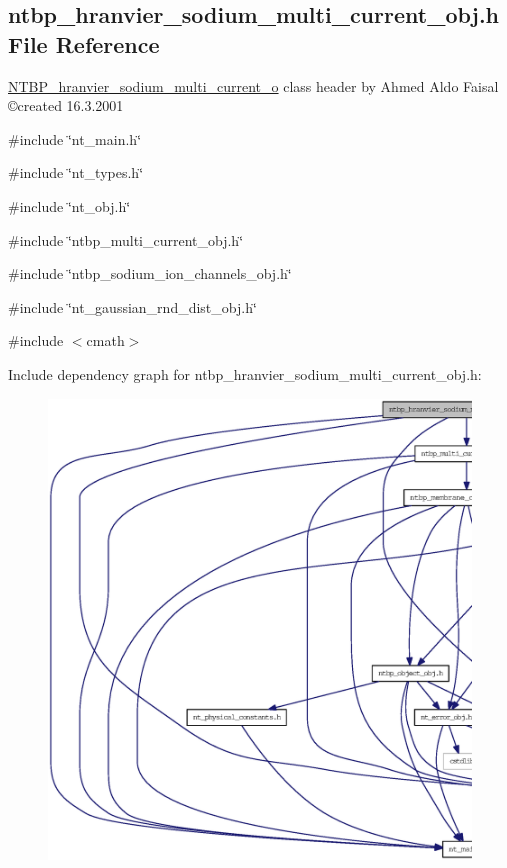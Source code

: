 \subsection{ntbp\_\-hranvier\_\-sodium\_\-multi\_\-current\_\-obj.h File Reference}
\label{ntbp__hranvier__sodium__multi__current__obj_8h}



\begin{DoxyItemize}
\item \hyperlink{class_n_t_b_p__hranvier__sodium__multi__current__o}{NTBP\_\-hranvier\_\-sodium\_\-multi\_\-current\_\-o} class header by Ahmed Aldo Faisal \copyright created 16.3.2001 
\end{DoxyItemize} 


{\ttfamily \#include \char`\"{}nt\_\-main.h\char`\"{}}\par
{\ttfamily \#include \char`\"{}nt\_\-types.h\char`\"{}}\par
{\ttfamily \#include \char`\"{}nt\_\-obj.h\char`\"{}}\par
{\ttfamily \#include \char`\"{}ntbp\_\-multi\_\-current\_\-obj.h\char`\"{}}\par
{\ttfamily \#include \char`\"{}ntbp\_\-sodium\_\-ion\_\-channels\_\-obj.h\char`\"{}}\par
{\ttfamily \#include \char`\"{}nt\_\-gaussian\_\-rnd\_\-dist\_\-obj.h\char`\"{}}\par
{\ttfamily \#include $<$cmath$>$}\par
Include dependency graph for ntbp\_\-hranvier\_\-sodium\_\-multi\_\-current\_\-obj.h:
\nopagebreak
\begin{figure}[H]
\begin{center}
\leavevmode
\includegraphics[width=400pt]{ntbp__hranvier__sodium__multi__current__obj_8h__incl}
\end{center}
\end{figure}
